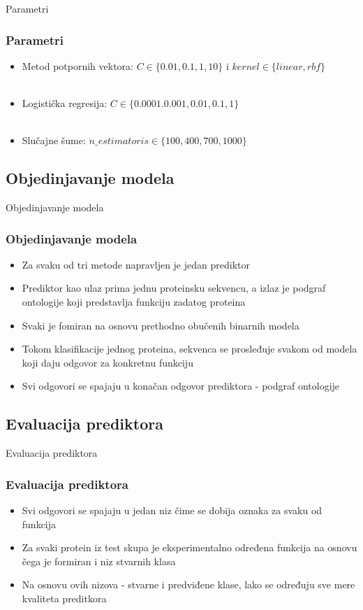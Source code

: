 \documentclass{beamer}
\begin{document}
\begin{frame}{Parametri}
	\frametitle{Parametri}
	\begin{itemize}
		\item Metod potpornih vektora: $C\in \{0.01, 0.1, 1, 10\}$ i $kernel \in \{linear, rbf\}$
		~ \\ ~ \\
		\item Logistička regresija: $C\in \{0.0001. 0.001, 0.01, 0.1, 1\}$
		~ \\ ~ \\
		\item Slučajne šume: $n\_estimatoris \in \{100, 400, 700, 1000\}$
		
	\end{itemize}
\end{frame}


\subsection{Objedinjavanje modela}
\begin{frame}{Objedinjavanje modela}
	\frametitle{Objedinjavanje modela}
	
	\begin{itemize}
		\item Za svaku od tri metode napravljen je jedan prediktor
		
		\item Prediktor kao ulaz prima jednu proteinsku sekvencu, a izlaz je podgraf ontologije koji predstavlja funkciju zadatog proteina
		
		\item Svaki je fomiran na osnovu prethodno obučenih binarnih modela
		
		\item Tokom klasifikacije jednog proteina, sekvenca se prosleđuje svakom od modela koji daju odgovor za konkretnu funkciju
		
		\item Svi odgovori se spajaju u konačan odgovor prediktora - podgraf ontologije
	\end{itemize}
\end{frame}


\subsection{Evaluacija prediktora}
\begin{frame}{Evaluacija prediktora}
	\frametitle{Evaluacija prediktora}
	
	\begin{itemize}
		\item Svi odgovori se spajaju u jedan niz čime se dobija oznaka za svaku od funkcija
		
		\item Za svaki protein iz test skupa je eksperimentalno određena funkcija na osnovu čega je formiran i niz stvarnih klasa
		
		\item Na osnovu ovih nizova - stvarne i predviđene klase, lako se određuju sve mere kvaliteta preditkora
	\end{itemize}
\end{frame}
\end{document}
